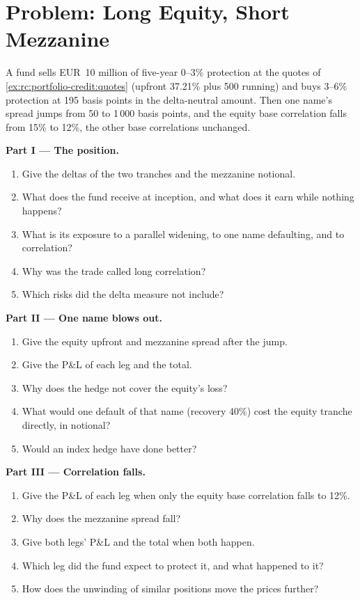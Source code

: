 \section{Problem: Long Equity, Short Mezzanine}

\begin{problem}\label{pb:rc:portfolio-credit:1}
A fund sells EUR~10 million of five-year 0--3\% protection at the quotes of
\cref{ex:rc:portfolio-credit:quotes} (upfront 37.21\% plus 500 running) and buys 3--6\%
protection at 195 basis points in the delta-neutral amount. Then one name's spread jumps
from 50 to 1\,000 basis points, and the equity base correlation falls from 15\% to 12\%,
the other base correlations unchanged.

\medskip\noindent\textbf{Part I --- The position.}
\begin{enumerate}
\item Give the deltas of the two tranches and the mezzanine notional.
\item What does the fund receive at inception, and what does it earn while nothing
happens?
\item What is its exposure to a parallel widening, to one name defaulting, and to
correlation?
\item Why was the trade called long correlation?
\item Which risks did the delta measure not include?
\end{enumerate}

\medskip\noindent\textbf{Part II --- One name blows out.}
\begin{enumerate}[resume]
\item Give the equity upfront and mezzanine spread after the jump.
\item Give the P\&L of each leg and the total.
\item Why does the hedge not cover the equity's loss?
\item What would one default of that name (recovery 40\%) cost the equity tranche
directly, in notional?
\item Would an index hedge have done better?
\end{enumerate}

\medskip\noindent\textbf{Part III --- Correlation falls.}
\begin{enumerate}[resume]
\item Give the P\&L of each leg when only the equity base correlation falls to 12\%.
\item Why does the mezzanine spread fall?
\item Give both legs' P\&L and the total when both happen.
\item Which leg did the fund expect to protect it, and what happened to it?
\item How does the unwinding of similar positions move the prices further?
\end{enumerate}


\end{problem}
